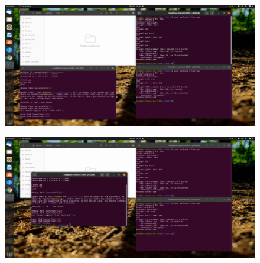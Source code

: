 \begin{figure}[h]
\centering
\includegraphics{images/result_9.png}
\end{figure}

\begin{figure}[h]
\centering
\includegraphics{images/result_10.png}
\end{figure}

\newpage
\hspace{0.7cm} 
